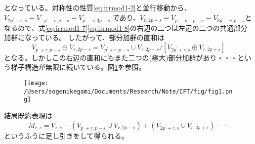 \documentclass[11pt, aps, longbibliography]{article}
\numberwithin{equation}{section}
\begin{document}
        となっている。対称性の性質\eqref{eq:irrmod1-2}と並行移動から、$V_{2p^\prime+r,s}\equiv V_{-p^\prime-r,p-s}\equiv V_{p^\prime-r,3p-s}$
        であり、$V_{r,2p+s}\equiv V_{p^\prime-r,-p-s}\equiv V_{3p^\prime-r,p-s}$となるので、式\eqref{eq:irrmod1-7}\eqref{eq:irrmod1-8}の右辺の二つは左辺の二つの共通部分加群になっている。
        したがって、部分加群の直和は
        \begin{equation}\label{eq:irrmod1-9}
            V_{p^\prime+r,p-s} \oplus V_{r,2p-s} = V_{p^\prime+r,p-s} \cup V_{r,2p-s}/\left[ V_{2p^\prime+r,s} \oplus V_{r,2p+s}  \right]
        \end{equation}
        となる。しかしこの右辺の直和にもまた二つの(極大)部分加群があり・・・という梯子構造が無限に続いている。図\ref{fig1}を参照。
        \begin{figure}[t]
            \centering
            \texttt{[image: /Users/sogenikegami/Documents/Research/Note/CFT/fig/fig1.png]}
            \caption{}
            \label{fig1}
        \end{figure}
        結局既約表現は
        \begin{equation}\label{eq:irrmod1-10}
            M_{r,s} = V_{r,s} - (V_{p^\prime+r,p-s} \cup V_{r,2p-s}) + (V_{2p^\prime+r,s} \cup V_{r,2p+s}) - \cdots
        \end{equation}
        というふうに足し引きをして得られる。
\end{document}
